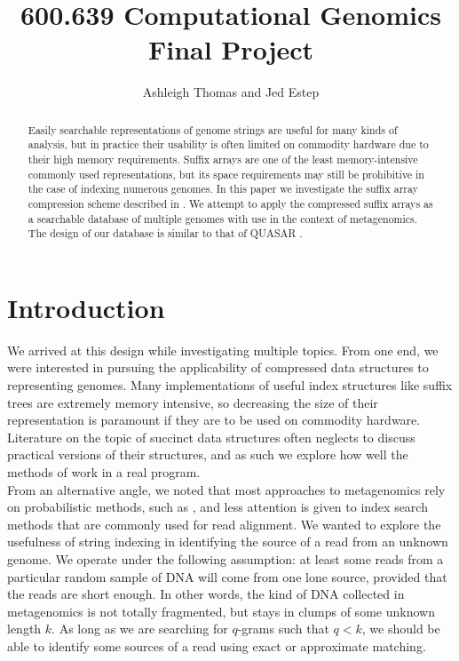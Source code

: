 \documentclass{article}
\begin{document}
\title{600.639 Computational Genomics\\
Final Project}
\date{}
\author{Ashleigh Thomas and Jed Estep}
\maketitle

\begin{abstract}
Easily searchable representations of genome strings are useful for many kinds of analysis, but in practice their usability is often limited on commodity hardware due to their high memory requirements. Suffix arrays are one of the least memory-intensive commonly used representations, but its space requirements may still be prohibitive in the case of indexing numerous genomes. In this paper we investigate the suffix array compression scheme described in \cite{GV05}. We attempt to apply the compressed suffix arrays as a searchable database of multiple genomes with use in the context of metagenomics. The design of our database is similar to that of QUASAR \cite{B99}.
\end{abstract}
\section{Introduction}
\label{sec-intro}
\indent We arrived at this design while investigating multiple topics. From one end, we were interested in pursuing the applicability of compressed data structures to representing genomes. Many implementations of useful index structures like suffix trees are extremely memory intensive, so decreasing the size of their representation is paramount if they are to be used on commodity hardware. Literature on the topic of succinct data structures often neglects to discuss practical versions of their structures, and as such we explore how well the methods of \cite{GV05} work in a real program.\\
\indent From an alternative angle, we noted that most approaches to metagenomics rely on probabilistic methods, such as \cite{BS09}, and less attention is given to index search methods that are commonly used for read alignment. We wanted to explore the usefulness of string indexing in identifying the source of a read from an unknown genome. We operate under the following assumption: at least some reads from a particular random sample of DNA will come from one lone source, provided that the reads are short enough. In other words, the kind of DNA collected in metagenomics is not totally fragmented, but stays in clumps of some unknown length $k$. As long as we are searching for $q$-grams such that $q < k$, we should be able to identify some sources of a read using exact or approximate matching.\\
\end{document}
